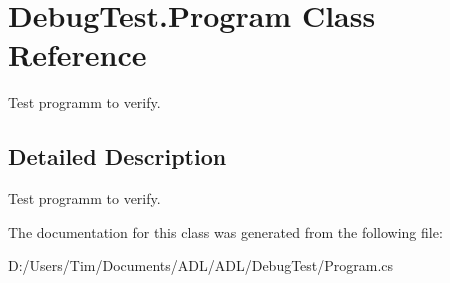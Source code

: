 \hypertarget{class_debug_test_1_1_program}{}\section{Debug\+Test.\+Program Class Reference}
\label{class_debug_test_1_1_program}


Test programm to verify.  




\subsection{Detailed Description}
Test programm to verify. 



The documentation for this class was generated from the following file\+:\begin{DoxyCompactItemize}
\item 
D\+:/\+Users/\+Tim/\+Documents/\+A\+D\+L/\+A\+D\+L/\+Debug\+Test/Program.\+cs\end{DoxyCompactItemize}
